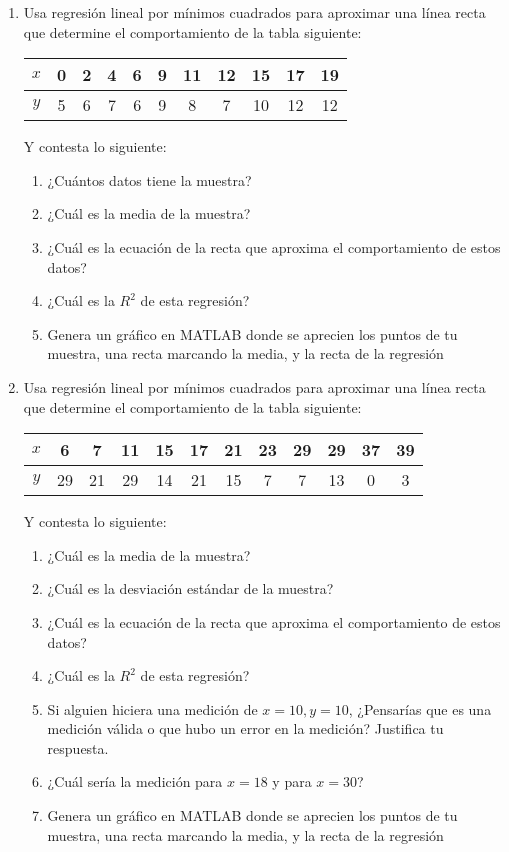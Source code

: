 \documentclass[]{book}
\theoremstyle{definition}
\begin{document}
\begin{enumerate}%
    \itemsep7ex
    \item Usa regresión lineal por mínimos cuadrados para aproximar una línea recta que determine el comportamiento de la tabla siguiente:
    \begin{table}[htbp]
        \centering
        \begin{tabular}{c|cccccccccc}
        $x$ & 0 & 2 & 4 & 6 & 9 & 11 & 12 & 15 & 17 & 19 \\ \hline
        $y$ & 5 & 6 & 7 & 6 & 9 & 8  & 7  & 10 & 12 & 12
        \end{tabular}
    \end{table}
    Y contesta lo siguiente:
    \begin{enumerate}
        \item ¿Cuántos datos tiene la muestra?
        \item ¿Cuál es la media de la muestra?
        \item ¿Cuál es la ecuación de la recta que aproxima el comportamiento de estos datos?
        \item ¿Cuál es la $R^2$ de esta regresión?
        \item Genera un gráfico en MATLAB donde se aprecien los puntos de tu muestra, una recta marcando la media, y la recta de la regresión
    \end{enumerate}
    \item Usa regresión lineal por mínimos cuadrados para aproximar una línea recta que determine el comportamiento de la tabla siguiente:
    \begin{table}[htbp]
        \centering
        \begin{tabular}{c|ccccccccccc}
        $x$ & 6  & 7  & 11 & 15 & 17 & 21 & 23 & 29 & 29 & 37 & 39 \\ \hline
        $y$ & 29 & 21 & 29 & 14 & 21 & 15 & 7  & 7  & 13 & 0  & 3 
        \end{tabular}
    \end{table}
    Y contesta lo siguiente:
    \begin{enumerate}
        \item ¿Cuál es la media de la muestra?
        \item ¿Cuál es la desviación estándar de la muestra?
        \item ¿Cuál es la ecuación de la recta que aproxima el comportamiento de estos datos?
        \item ¿Cuál es la $R^2$ de esta regresión?
        \item Si alguien hiciera una medición de $x=10, y=10$, ¿Pensarías que es una medición válida o que hubo un error en la medición? Justifica tu respuesta.
        \item ¿Cuál sería la medición para $x=18$ y para $x=30$?
        \item Genera un gráfico en MATLAB donde se aprecien los puntos de tu muestra, una recta marcando la media, y la recta de la regresión
    \end{enumerate}
\end{enumerate}
\end{document}
